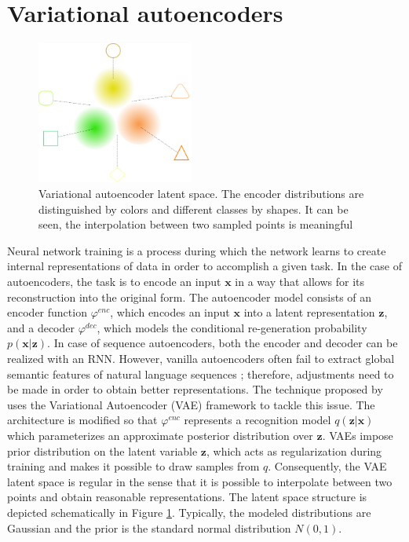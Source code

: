 \section{Variational autoencoders}
\label{02:sec:vae}
\begin{figure}[t]
    \centering
    \includegraphics[width=0.46\textwidth]{images/VAE.png}
    \caption{Variational autoencoder latent space. The encoder distributions are distinguished by colors and different classes by shapes. It can be seen, the interpolation between two sampled points is meaningful}
    \label{fig:vae}
\end{figure}
Neural network training is a process during which the network learns to create internal representations of data in order to accomplish a given task.
In the case of autoencoders, the task is to encode an input $\mathbf{x}$ in a way that allows for its reconstruction into the original form.
The autoencoder model consists of an encoder function $\varphi^{enc}$, which encodes an input $\mathbf{x}$ into a latent representation $\mathbf{z}$, and a decoder $\varphi^{dec}$, which models the conditional re-generation probability $p(\mathbf{x}|\mathbf{z})$.
In case of sequence autoencoders, both the encoder and decoder can be realized with an RNN.
However, vanilla autoencoders often fail to extract global semantic features of natural language sequences \cite{bowman2015generating}; therefore, adjustments need to be made in order to obtain better representations.
The technique proposed by \citet{kingma2013auto} uses the Variational Autoencoder (VAE) framework to tackle this issue.
The architecture is modified so that $\varphi^{enc}$ represents a recognition model $q(\mathbf{z}|\mathbf{x})$ which parameterizes an approximate posterior distribution over $\mathbf{z}$.
VAEs impose prior distribution on the latent variable $\mathbf{z}$, which acts as regularization during training and makes it possible to draw samples from $q$.
Consequently, the VAE latent space is regular in the sense that it is possible to interpolate between two points and obtain reasonable representations.
The latent space structure is depicted schematically in Figure \ref{fig:vae}.
Typically, the modeled distributions are Gaussian and the prior is the standard normal distribution $N(0, 1)$.

